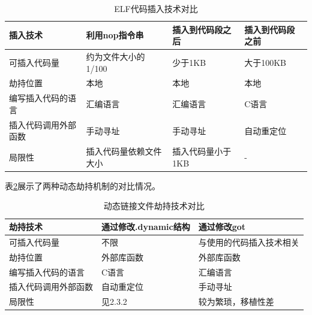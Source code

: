 \begin{table}
  \centering
  \caption{ELF代码插入技术对比}
  \label{conclusion1}
  \begin{tabular}{l|l|l|l}
     \hline
     插入技术  & 利用nop指令串 & 插入到代码段之后&插入到代码段之前 \\\hline \hline
 可插入代码量  & 约为文件大小的1/100  & 少于1KB & 大于100KB   \\ \hline
   劫持位置    &  本地   &   本地 & 本地            \\ \hline
  编写插入代码的语言 & 汇编语言 & 汇编语言 & C语言  \\ \hline
   插入代码调用外部函数& 手动寻址  & 手动寻址 & 自动重定位       \\ \hline  
     局限性  & 插入代码量依赖文件大小&插入代码量小于1KB& -       \\ \hline
  \end{tabular}
\end{table} 

表\ref{conclusion2}展示了两种动态劫持机制的对比情况。

\begin{table}
  \centering
  \caption{动态链接文件劫持技术对比}
  \label{conclusion2}
  \begin{tabular}{l|l|l}
     \hline
     劫持技术  & 通过修改.dynamic结构&通过修改got   \\\hline \hline
 可插入代码量  & 不限  & 与使用的代码插入技术相关   \\ \hline
   劫持位置    & 外部库函数 & 外部库函数            \\ \hline
  编写插入代码的语言 & C语言 & 汇编语言         \\ \hline
   插入代码调用外部函数 & 自动重定位  & 手动寻址       \\ \hline  
     局限性  & 见2.3.2 & 较为繁琐，移植性差       \\ \hline
  \end{tabular}
\end{table} 

 




